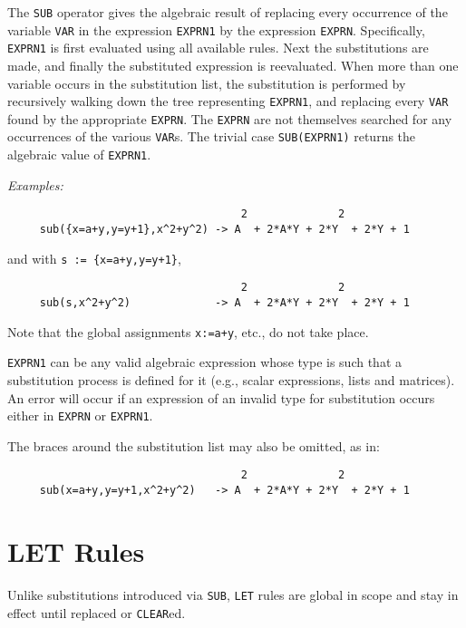 \documentclass[11pt,letterpaper]{book}
\makeatletter
\newcommand{\underscore}{\_}
\newcommand{\ttindex}[1]{{\renewcommand{\_}{\protect\underscore}%
                          \index{#1@{\tt #1}}}}
\makeatother
\begin{document}
The {\tt SUB} operator gives the algebraic result of replacing every
occurrence of the variable {\tt VAR} in the expression {\tt EXPRN1} by the
expression {\tt EXPRN}.  Specifically, {\tt EXPRN1} is first evaluated
using all available rules.  Next the substitutions are made, and finally
the substituted expression is reevaluated.  When more than one variable
occurs in the substitution list, the substitution is performed by
recursively walking down the tree representing {\tt EXPRN1}, and replacing
every {\tt VAR} found by the appropriate {\tt EXPRN}.  The {\tt EXPRN} are
not themselves searched for any occurrences of the various {\tt VAR}s.
The trivial case {\tt SUB(EXPRN1)} returns the algebraic value of
{\tt EXPRN1}.

{\it Examples:}
{\small\begin{verbatim}
                                    2              2
     sub({x=a+y,y=y+1},x^2+y^2) -> A  + 2*A*Y + 2*Y  + 2*Y + 1
\end{verbatim}}
and with {\tt s := \{x=a+y,y=y+1\}},
{\small\begin{verbatim}
                                    2              2
     sub(s,x^2+y^2)             -> A  + 2*A*Y + 2*Y  + 2*Y + 1
\end{verbatim}}

Note that the global assignments {\tt x:=a+y}, etc., do not take place.

{\tt EXPRN1} can be any valid algebraic expression whose type is such that
a substitution process is defined for it (e.g., scalar expressions, lists
and matrices).  An error will occur if an expression of an invalid type
for substitution occurs either in {\tt EXPRN} or {\tt EXPRN1}.

The braces around the substitution list may also be omitted, as in:

{\small\begin{verbatim}
                                    2              2
     sub(x=a+y,y=y+1,x^2+y^2)   -> A  + 2*A*Y + 2*Y  + 2*Y + 1
\end{verbatim}}

\section{LET Rules}\ttindex{LET}
Unlike substitutions introduced via {\tt SUB}, {\tt LET}
rules are global in scope and stay in effect until replaced or {\tt CLEAR}ed.
\end{document}
